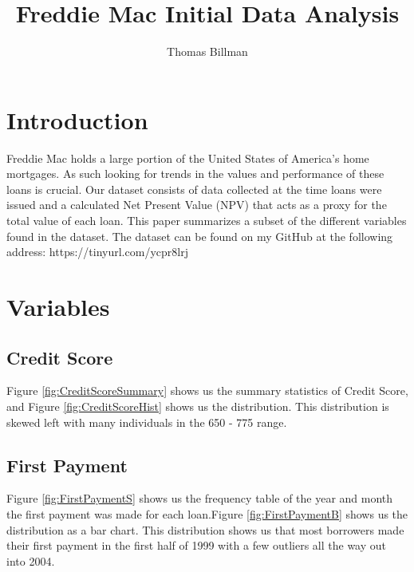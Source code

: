 \documentclass[10pt,twocolumn,letterpaper]{article}
\begin{document}
\title{Freddie Mac Initial Data Analysis}

\author{Thomas Billman}

\maketitle


\section{Introduction}

Freddie Mac holds a large portion of the United States of America's home mortgages. As such looking for trends in the values and performance of these loans is crucial. Our dataset consists of data collected at the time loans were issued and a calculated Net Present Value (NPV) that acts as a proxy for the total value of each loan. This paper summarizes a subset of the different variables found in the dataset. The dataset can be found on my GitHub at the following address:
https://tinyurl.com/ycpr8lrj

\section{Variables}
\subsection{Credit Score}

Figure \ref{fig:CreditScoreSummary} shows us the summary statistics of Credit Score, and Figure \ref{fig:CreditScoreHist} shows us the distribution. This distribution is skewed left with many individuals in the 650 - 775 range. 

\subsection{First Payment}

Figure \ref{fig:FirstPaymentS} shows us the frequency table of the year and month the first payment was made for each loan.Figure \ref{fig:FirstPaymentB} shows us the distribution as a bar chart. This distribution shows us that most borrowers made their first payment in the first half of 1999 with a few outliers all the way out into 2004.
\end{document}
